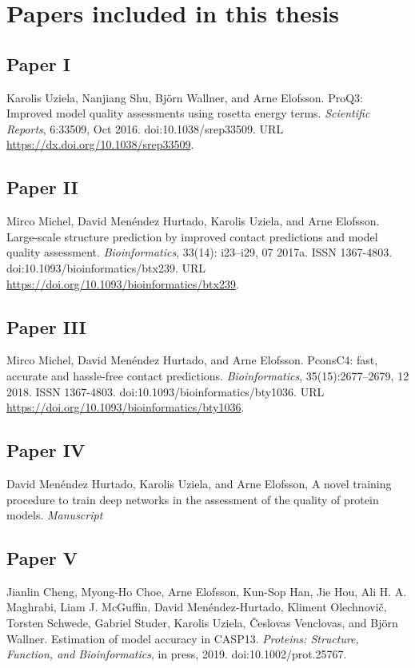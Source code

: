\chapter*{Papers included in this thesis}

\section*{Paper \textcolor[cmyk]{0, 0.87, 0.68, 0.32}{I}}
Karolis Uziela, Nanjiang Shu, Björn Wallner, and Arne Elofsson. ProQ3: Improved model quality
assessments using rosetta energy terms. \textit{Scientific Reports}, 6:33509, Oct 2016. doi:10.1038/srep33509.
URL \url{https://dx.doi.org/10.1038/srep33509}.

\section*{Paper  \textcolor[cmyk]{0, 0.87, 0.68, 0.32}{II}}
Mirco Michel, David Menéndez Hurtado, Karolis Uziela, and Arne Elofsson. Large-scale structure
prediction by improved contact predictions and model quality assessment. \textit{Bioinformatics}, 33(14):
i23–i29, 07 2017a. ISSN 1367-4803. doi:10.1093/bioinformatics/btx239. URL
\url{https://doi.org/10.1093/bioinformatics/btx239}.


\section*{Paper \textcolor[cmyk]{0, 0.87, 0.68, 0.32}{III}}
Mirco Michel, David Menéndez Hurtado, and Arne Elofsson. PconsC4: fast, accurate and hassle-free
contact predictions. \textit{Bioinformatics}, 35(15):2677–2679, 12 2018. ISSN 1367-4803.
doi:10.1093/bioinformatics/bty1036. URL \url{https://doi.org/10.1093/bioinformatics/bty1036}.


\section*{Paper \textcolor[cmyk]{0, 0.87, 0.68, 0.32}{IV}}
David Menéndez Hurtado, Karolis Uziela, and Arne Elofsson, A novel training procedure to train deep networks in the assessment of the quality of protein models. \emph{Manuscript}


\section*{Paper \textcolor[cmyk]{0, 0.87, 0.68, 0.32}{V}}

Jianlin Cheng, Myong-Ho Choe, Arne Elofsson, Kun-Sop Han, Jie Hou, Ali H. A. Maghrabi, Liam J.
McGuffin, David Menéndez-Hurtado, Kliment Olechnovič, Torsten Schwede, Gabriel Studer, Karolis
Uziela, Česlovas Venclovas, and Björn Wallner. Estimation of model accuracy in CASP13. \emph{Proteins:
Structure, Function, and Bioinformatics}, in press, 2019. doi:10.1002/prot.25767.

